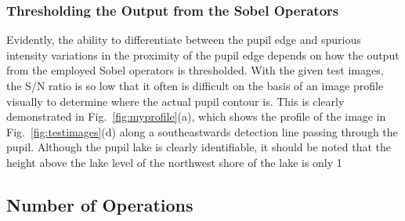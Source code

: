 
\subsubsection{Thresholding the Output from the Sobel Operators}

Evidently, the ability to differentiate between the pupil edge and
spurious intensity variations in the proximity of the pupil edge
depends on how the output from the employed Sobel operators is
thresholded.  With the given test images, the S/N ratio is so low that
it often is difficult on the basis of an image profile visually to
determine where the actual pupil contour is.  This is clearly
demonstrated in Fig.~\ref{fig:myprofile}(a), which shows the profile 
of the image in Fig.~\ref{fig:testimages}(d) along a southeastwards
detection line passing through the pupil.  Although the pupil lake is
clearly identifiable, it should be noted that the height above the
lake level of the northwest shore of the lake is only 1 


\subsection{Number of Operations}
\label{algo:pos:O}

